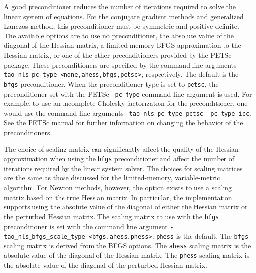 A good preconditioner reduces the number of iterations required to
solve the linear system of equations.  For the conjugate gradient
methods and generalized Lanczos method, this preconditioner must be
symmetric and positive definite.  The available options are to use no
preconditioner, the absolute value of the diagonal of the Hessian
matrix, a limited-memory BFGS approximation to the Hessian matrix, or
one of the other preconditioners provided by the PETSc package.  These
preconditioners are specified by the command line arguments 
{\tt -tao\_nls\_pc\_type <none,ahess,bfgs,petsc>}, respectively. The
default is the {\tt bfgs} preconditioner.  When the preconditioner
type is set to {\tt petsc}, the preconditioner set with the PETSc 
{\tt -pc\_type} command line argument is used.  For example, to use an
incomplete Cholesky factorization for the preconditioner, one would
use the command line arguments 
{\tt -tao\_nls\_pc\_type petsc -pc\_type icc}.  See the PETSc manual 
for further information on changing the behavior of the preconditioners.

The choice of scaling matrix can significantly affect the quality 
of the Hessian approximation when using the {\tt bfgs} preconditioner and
affect the number of iterations required by the linear system solver.
The choices for scaling matrices are the same as those discussed for 
the limited-memory, variable-metric algorithm.  For Newton methods,
however, the option exists to use a scaling matrix based on the true
Hessian matrix.  In particular, the implementation supports using the 
absolute value of the diagonal of either the Hessian matrix or the perturbed 
Hessian matrix.  The scaling 
matrix to use with the {\tt bfgs} preconditioner is set with the 
command line argument {\tt -tao\_nls\_bfgs\_scale\_type <bfgs,ahess,phess>}; 
{\tt phess} is the default.  The {\tt bfgs} scaling matrix is derived from 
the BFGS options.  The {\tt ahess} scaling matrix is the absolute value of 
the diagonal of the Hessian matrix.  The {\tt phess} scaling matrix is
the absolute value of the diagonal of the perturbed Hessian matrix.

